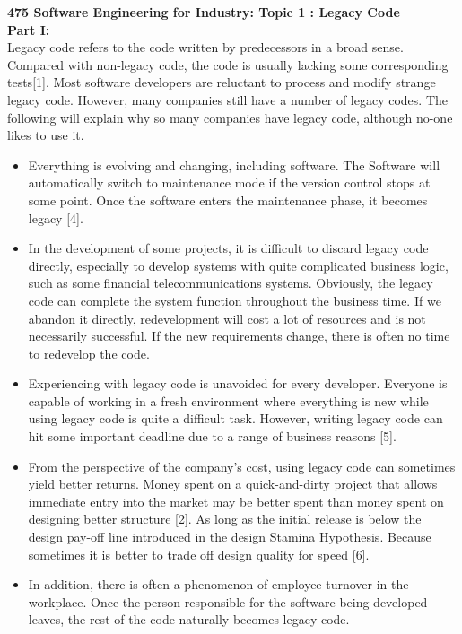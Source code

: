\documentclass[12pt]{article}
\begin{document}
\pagestyle{empty}
{\bf 475 Software Engineering for Industry: Topic 1 : Legacy Code} \\

{\bf Part I: } \\[10px]
Legacy code refers to the code written by predecessors in a broad sense. Compared with non-legacy code, the code is usually lacking some corresponding tests[1]. Most software developers are reluctant to process and modify strange legacy code. However, many companies still have a number of legacy codes. The following will explain why so many companies have legacy code, although no-one likes to use it. 
\begin{itemize}
\item Everything is evolving and changing, including software. The Software will automatically switch to maintenance mode if the version control stops at some point. Once the software enters the maintenance phase, it becomes legacy [4]. 
\item In the development of some projects, it is difficult to discard legacy code directly, especially to develop systems with quite complicated business logic, such as some financial telecommunications systems. Obviously, the legacy code can complete the system function throughout the business time. If we abandon it directly, redevelopment will cost a lot of resources and is not necessarily successful. If the new requirements change, there is often no time to redevelop the code. 
\item Experiencing with legacy code is unavoided for every developer. Everyone is capable of working in a fresh environment where everything is new while using legacy code is quite a difficult task.  However, writing legacy code can hit some important deadline due to a range of business reasons [5]. 
\item From the perspective of the company's cost, using legacy code can sometimes yield better returns. Money spent on a quick-and-dirty project that allows immediate entry into the market may be better spent than money spent on designing better structure [2]. As long as the initial release is below the design pay-off line introduced in the design Stamina Hypothesis. Because sometimes it is better to trade off design quality for speed [6].
\item In addition, there is often a phenomenon of employee turnover in the workplace. Once the person responsible for the software being developed leaves, the rest of the code naturally becomes legacy code.
\end{itemize}
\end{document}
